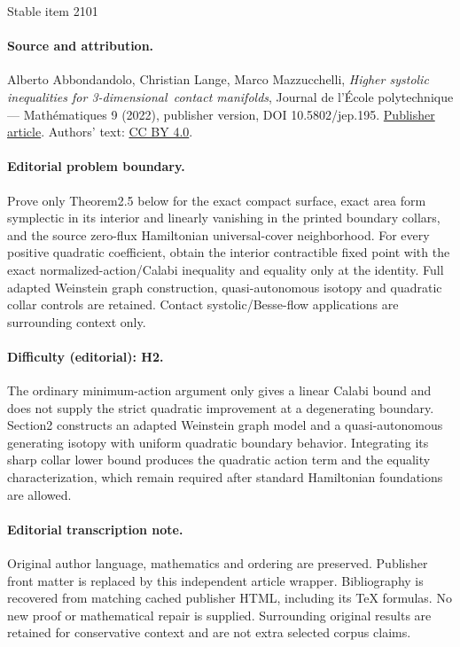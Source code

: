 \documentclass[11pt]{article}
\numberwithin{equation}{section}
\theoremstyle{definition}
\begin{document}
\begin{center}{\Large Stable item 2101}\end{center}
\paragraph{Source and attribution.}
Alberto Abbondandolo, Christian Lange, Marco Mazzucchelli, \emph{Higher systolic inequalities for 3-dimensional contact manifolds}, Journal de l’École polytechnique — Mathématiques 9 (2022), publisher version, DOI 10.5802/jep.195. \href{https://jep.centre-mersenne.org/articles/10.5802/jep.195/}{Publisher article}. Authors' text: \href{https://creativecommons.org/licenses/by/4.0/}{CC BY 4.0}.
\paragraph{Editorial problem boundary.}
Prove only Theorem2.5 below for the exact compact surface, exact area form symplectic in its interior and linearly vanishing in the printed boundary collars, and the source zero-flux Hamiltonian universal-cover neighborhood. For every positive quadratic coefficient, obtain the interior contractible fixed point with the exact normalized-action/Calabi inequality and equality only at the identity. Full adapted Weinstein graph construction, quasi-autonomous isotopy and quadratic collar controls are retained. Contact systolic/Besse-flow applications are surrounding context only.
\paragraph{Difficulty (editorial): H2.}
The ordinary minimum-action argument only gives a linear Calabi bound and does not supply the strict quadratic improvement at a degenerating boundary. Section2 constructs an adapted Weinstein graph model and a quasi-autonomous generating isotopy with uniform quadratic boundary behavior. Integrating its sharp collar lower bound produces the quadratic action term and the equality characterization, which remain required after standard Hamiltonian foundations are allowed.
\paragraph{Editorial transcription note.}
Original author language, mathematics and ordering are preserved. Publisher front matter is replaced by this independent article wrapper. Bibliography is recovered from matching cached publisher HTML, including its TeX formulas. No new proof or mathematical repair is supplied. Surrounding original results are retained for conservative context and are not extra selected corpus claims.
\clearpage
\end{document}

